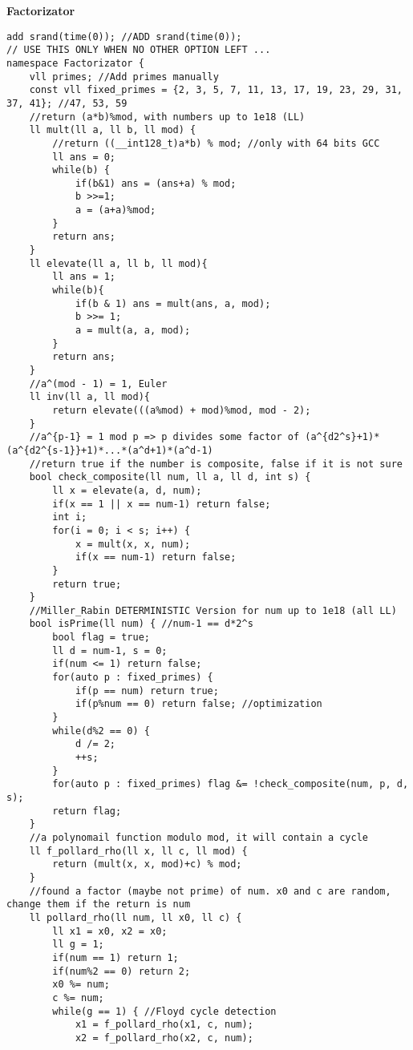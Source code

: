 \documentclass[a4paper,10pt]{article}
\newcommand{\titleAlg}[1]{\vspace{-10pt}
\begin{center}\textbf{#1}\end{center} \vspace{-10pt}}
\begin{document}
\titleAlg{Factorizator}
\begin{multicols}{2}
\begin{verbatim}
add srand(time(0)); //ADD srand(time(0));
// USE THIS ONLY WHEN NO OTHER OPTION LEFT ...
namespace Factorizator {
    vll primes; //Add primes manually
    const vll fixed_primes = {2, 3, 5, 7, 11, 13, 17, 19, 23, 29, 31, 37, 41}; //47, 53, 59
    //return (a*b)%mod, with numbers up to 1e18 (LL)
    ll mult(ll a, ll b, ll mod) {
        //return ((__int128_t)a*b) % mod; //only with 64 bits GCC
        ll ans = 0;
        while(b) {
            if(b&1) ans = (ans+a) % mod;
            b >>=1;
            a = (a+a)%mod;
        }
        return ans;
    }
    ll elevate(ll a, ll b, ll mod){
        ll ans = 1;
        while(b){
            if(b & 1) ans = mult(ans, a, mod);
            b >>= 1;
            a = mult(a, a, mod);
        }
        return ans;
    }
    //a^(mod - 1) = 1, Euler
    ll inv(ll a, ll mod){
        return elevate(((a%mod) + mod)%mod, mod - 2);
    }
    //a^{p-1} = 1 mod p => p divides some factor of (a^{d2^s}+1)*(a^{d2^{s-1}}+1)*...*(a^d+1)*(a^d-1)
    //return true if the number is composite, false if it is not sure
    bool check_composite(ll num, ll a, ll d, int s) {
        ll x = elevate(a, d, num);
        if(x == 1 || x == num-1) return false;
        int i;
        for(i = 0; i < s; i++) {
            x = mult(x, x, num);
            if(x == num-1) return false;
        }
        return true;
    }
    //Miller_Rabin DETERMINISTIC Version for num up to 1e18 (all LL)
    bool isPrime(ll num) { //num-1 == d*2^s
        bool flag = true;
        ll d = num-1, s = 0;
        if(num <= 1) return false;
        for(auto p : fixed_primes) { 
            if(p == num) return true;
            if(p%num == 0) return false; //optimization
        }
        while(d%2 == 0) {
            d /= 2;
            ++s;
        }
        for(auto p : fixed_primes) flag &= !check_composite(num, p, d, s);
        return flag;
    }
    //a polynomail function modulo mod, it will contain a cycle 
    ll f_pollard_rho(ll x, ll c, ll mod) {
        return (mult(x, x, mod)+c) % mod;
    }
    //found a factor (maybe not prime) of num. x0 and c are random, change them if the return is num
    ll pollard_rho(ll num, ll x0, ll c) {
        ll x1 = x0, x2 = x0;
        ll g = 1;
        if(num == 1) return 1;
        if(num%2 == 0) return 2;
        x0 %= num;
        c %= num;
        while(g == 1) { //Floyd cycle detection
            x1 = f_pollard_rho(x1, c, num);
            x2 = f_pollard_rho(x2, c, num);

\end{verbatim}
\end{multicols}
\end{document}
